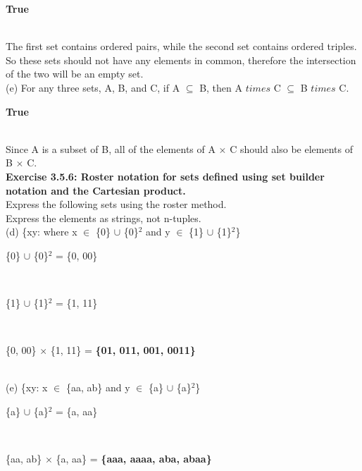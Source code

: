 \documentclass[12pt, letterpaper, twoside]{article}
\begin{document}
\centerline{\textbf{True}}\\
The first set contains ordered pairs, while the second set contains ordered triples. So these sets should not have any elements in common, therefore the intersection of the two will be an empty set.\\
\break
(e) For any three sets, A, B, and C, if A $\subseteq$ B, then A $times$ C $\subseteq$ B $times$ C.\\
\centerline{\textbf{True}}\\
Since A is a subset of B, all of the elements of A $\times$ C should also be elements of B $\times$ C.\\
\break
\noindent\textbf{Exercise 3.5.6: Roster notation for sets defined using set builder notation and the Cartesian product.}\\
Express the following sets using the roster method. \\
Express the elements as strings, not n-tuples.\\
\break
(d) \{xy: where x $\in$ \{0\} $\cup$ \{0\}$^2$ and y $\in$ \{1\} $\cup$ \{1\}$^2$\}\\
\break
\centerline{\{0\} $\cup$ \{0\}$^2$ = \{0, 00\}}\\
\centerline{\{1\} $\cup$ \{1\}$^2$ = \{1, 11\}}\\
\centerline{\{0, 00\} $\times$ \{1, 11\} = \textbf{\{01, 011, 001, 0011\}}}\\
\break
(e) \{xy: x $\in$ \{aa, ab\} and y $\in$ \{a\} $\cup$ \{a\}$^2$\}\\
\break
\centerline{\{a\} $\cup$ \{a\}$^2$ = \{a, aa\}}\\
\centerline{\{aa, ab\} $\times$ \{a, aa\} = \textbf{\{aaa, aaaa, aba, abaa\}}}\\
\break
\end{document}
